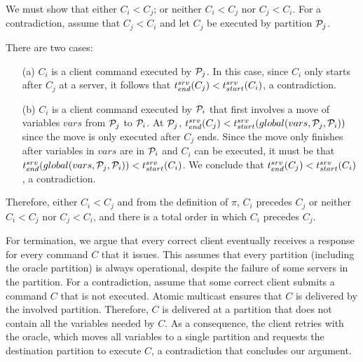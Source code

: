 We must show that either $C_i < C_j$; or neither $C_i < C_j$ nor $C_j < C_i$.
For a contradiction, assume that $C_j <  C_i$ and let $C_j$ be executed by
partition $\mathcal{P}_j$.

There are two cases:
\begin{enumerate}
\item[(a)] $C_i$ is a client command executed by $\mathcal{P}_j$. In this case, since
$C_i$ only starts after $C_j$ at a server, it follows that $t^{srv}_{end}(C_j) <
t^{srv}_{start}(C_i)$, a contradiction.
\item[(b)] $C_i$ is a client command executed by $\mathcal{P}_i$ that first involves a
move of variables $vars$ from $\mathcal{P}_j$ to $\mathcal{P}_i$. At $\mathcal{P}_j$, $t^{srv}_{end}(C_j) <
t^{srv}_{start}(global(vars,\mathcal{P}_j,\mathcal{P}_i))$ since the move is only executed after $C_j$
ends. Since the move only finishes after variables in $vars$ are in $\mathcal{P}_i$ and
$C_i$ can be executed, it must be that
$t^{srv}_{end}(global(vars,\mathcal{P}_j,\mathcal{P}_i)) < t^{srv}_{start}(C_i)$. We conclude that $t^{srv}_{end}(C_j) <
t^{srv}_{start}(C_i)$, a contradiction.
\end{enumerate}
Therefore, either $C_i < C_j$ and from the definition of $\pi$, $C_i$ precedes
$C_j$ or neither $C_i < C_j$ nor $C_j < C_i$, and there is a total order in
which $C_i$ precedes $C_j$.

For termination, we argue that every correct client eventually receives a
response for every command $C$ that it issues. This assumes that every partition
(including the oracle partition) is always operational, despite the failure of
some servers in the partition. For a contradiction, assume that some correct
client submits a command $C$ that is not executed. Atomic multicast ensures that
$C$ is delivered by the involved partition. Therefore, $C$ is delivered at a
partition that does not contain all the variables needed by $C$. As a
consequence, the client retries with the oracle, which moves all variables to a
single partition and requests the destination partition to execute $C$, a
contradiction that concludes our argument.


